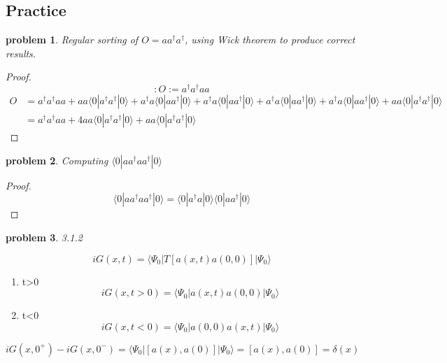 \documentclass[a4paper,11pt]{article}
\newtheorem{proof}{proof}[section]
\newtheorem{problem}{problem}[subsection]
\begin{document}
\subsection{Practice}
\begin{problem}
  Regular sorting of $O=aa^\dag a^\dag$, using Wick theorem to produce correct results.
\end{problem}
\begin{proof}
  \begin{equation*}
    :O:=a^\dag a^\dag aa
  \end{equation*}
  \begin{equation*}
    \begin{split}
       O&=a^\dag a^\dag aa+aa\langle0|a^\dag a^\dag|0\rangle+a^\dag a\langle0|aa^\dag|0\rangle+a^\dag a\langle0|aa^\dag|0\rangle+a^\dag a\langle0|aa^\dag|0\rangle+a^\dag a\langle0|aa^\dag|0\rangle+aa\langle0|a^\dag a^\dag|0\rangle\\
         &=a^\dag a^\dag aa+4aa\langle0|a^\dag a^\dag|0\rangle+aa\langle0|a^\dag a^\dag|0\rangle
    \end{split}
  \end{equation*}
\end{proof}
\begin{problem}
  Computing $\langle0|aa^\dag aa^\dag|0\rangle$
\end{problem}
\begin{proof}
  \begin{equation*}
    \langle0|aa^\dag aa^\dag|0\rangle=\langle0|a^\dag a|0\rangle\langle0|aa^\dag|0\rangle
  \end{equation*}
\end{proof}
\begin{problem}
  3.1.2
\end{problem}
\begin{equation*}
  iG(x,t)=\langle\Psi_0|T[a(x,t)a(0,0)]|\Psi_0\rangle
\end{equation*}
\begin{enumerate}
  \item t>0
  \begin{equation*}
    iG(x,t>0)=\langle\Psi_0|a(x,t)a(0,0)|\Psi_0\rangle
  \end{equation*}
  \item t<0
  \begin{equation*}
    iG(x,t<0)=\langle\Psi_0|a(0,0)a(x,t)|\Psi_0\rangle
  \end{equation*}
\end{enumerate}
\begin{equation*}
  iG(x,0^+)-iG(x,0^-)=\langle\Psi_0|[a(x),a(0)]|\Psi_0\rangle=[a(x),a(0)]=\delta(x)
\end{equation*}
\end{document}
